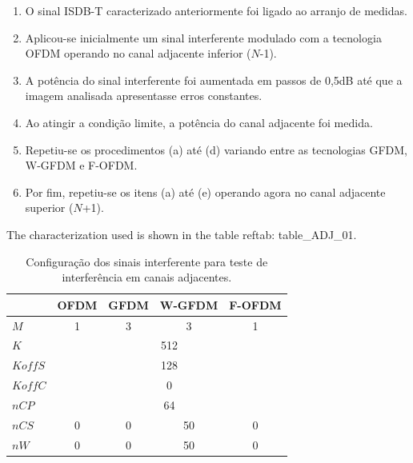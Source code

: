 \begin{enumerate}[label=(\alph*)]
    \item   O sinal ISDB-T caracterizado anteriormente foi ligado ao arranjo de medidas.
    \item 	Aplicou-se inicialmente um sinal interferente modulado com a tecnologia OFDM operando no canal adjacente inferior ($N$-1).  
    \item 	A potência do sinal interferente foi aumentada em passos de 0,5dB até que a imagem analisada apresentasse erros constantes.
    \item 	Ao atingir a condição limite, a potência do canal adjacente foi medida.
    \item 	Repetiu-se os procedimentos (a) até (d) variando entre as tecnologias GFDM, W-GFDM e F-OFDM.
    \item 	Por fim, repetiu-se os itens (a) até (e) operando agora no canal adjacente superior ($N$+1).
\end{enumerate}

The characterization used is shown in the table ref{tab: table_ADJ_01}.

\begin{table}[h!]
	\begin{center}
		\centering
		\caption{Configuração dos sinais interferente para teste de interferência  em canais adjacentes.}
		\label{tab:table_ADJ_01}
		\begin{tabular}{|l|c|c|c|c|}
			\hline
			\textbf{} & \textbf{OFDM} & \textbf{GFDM} & \textbf{W-GFDM} & \textbf{F-OFDM}\\
			\hline
			$M$ & 1 & 3 & 3 & 1\\
			\hline
			$K$ &\multicolumn{4}{c|}{512}\\
			\hline
			$KoffS$ &\multicolumn{4}{c|}{128}\\
			\hline
			$KoffC$ &\multicolumn{4}{c|}{0}\\
			\hline
			$nCP$ &\multicolumn{4}{c|}{64}\\
			\hline
			$nCS$ & 0 & 0 & 50 & 0\\
			\hline
			$nW$ & 0 & 0 & 50 & 0\\
			\hline
		\end{tabular}
	\end{center}
\end{table}


